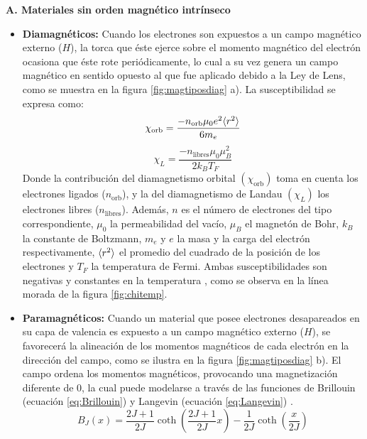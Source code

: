 \documentclass[../main.tex]{subfiles}
\begin{document}
\textbf{A. Materiales sin orden magnético intrínseco}
\begin{itemize}
    \item \textbf{Diamagnéticos:} Cuando los electrones son expuestos a un campo magnético externo ($H$), la torca que éste ejerce sobre el momento magnético del electrón ocasiona que éste rote periódicamente, lo cual a su vez genera un campo magnético en sentido opuesto al que fue aplicado debido a la Ley de Lens, como se muestra en la figura \ref{fig:magtiposdiag} a). La susceptibilidad se expresa como:
    \begin{equation}
        \chi_{\text{orb}}=\dfrac{-n_{\text{orb}}\mu_0e^2\langle r^2 \rangle}{6m_e}
        \label{eq:chidiamagorb}
    \end{equation}
    \begin{equation}
        \chi_L=\dfrac{-n_\text{libres}\mu_0\mu_B^2}{2k_BT_F}
        \label{eq:chidiamaglandau}
    \end{equation}
    Donde la contribución del diamagnetismo orbital $(\chi_\text{orb})$ toma en cuenta los electrones ligados ($n_\text{orb}$), y la del diamagnetismo de Landau $(\chi_L)$ los electrones libres ($n_\text{libres}$). Además, $n$ es el número de electrones del tipo correspondiente, $\mu_0$ la permeabilidad del vacío, $\mu_B$ el magnetón de Bohr, $k_B$ la constante de Boltzmann, $m_e$ y $e$ la masa y la carga del electrón respectivamente, $\langle r^2 \rangle$ el promedio del cuadrado de la posición de los electrones y $T_F$ la temperatura de Fermi. Ambas susceptibilidades son negativas y constantes en la temperatura \cite{coey2010magnetism}, como se observa en la línea morada de la figura \ref{fig:chitemp}.
    \item \textbf{Paramagnéticos:} Cuando un material que posee electrones desapareados en su capa de valencia es expuesto a un campo magnético externo ($H$), se favorecerá la alineación de los momentos magnéticos de cada electrón en la dirección del campo, como se ilustra en la figura \ref{fig:magtiposdiag} b). El campo ordena los momentos magnéticos, provocando una magnetización diferente de 0, la cual puede modelarse a través de las funciones de Brillouin (ecuación \ref{eq:Brillouin}) y Langevin (ecuación \ref{eq:Langevin}) \cite{coey2010magnetism}.
    \begin{equation}
        B_J(x)=\dfrac{2J+1}{2J}\coth\left(\dfrac{2J+1}{2J}x\right)-\dfrac{1}{2J}\coth\left(\dfrac{x}{2J}\right)
        \label{eq:Brillouin}
    \end{equation}
    \begin{equation}

\end{equation}
\end{itemize}
\end{document}

